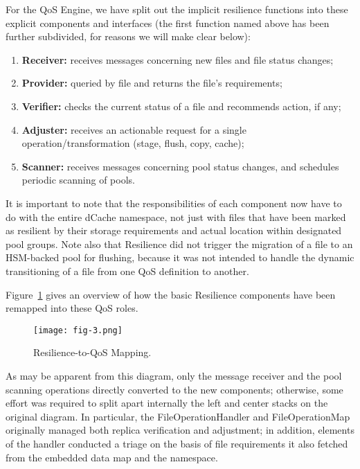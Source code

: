 \documentclass{webofc}
\begin{document}
For the QoS Engine, we have split out the implicit resilience functions into these explicit components and interfaces (the first function named above has been further subdivided, for reasons we will make clear below):


\begin{enumerate}

\item  {\bf Receiver:}  receives messages concerning new files and file status changes;
\item  {\bf Provider:}  queried by file and returns the file’s requirements;
\item  {\bf Verifier:}  checks the current status of a file and recommends action, if any;
\item  {\bf Adjuster:}  receives an actionable request for a single operation/transformation (stage, flush, copy, cache);
\item  {\bf Scanner:}  receives messages concerning pool status changes, and schedules periodic scanning of pools.

\end{enumerate}



It is important to note that the responsibilities of each component now have to do with the entire dCache namespace, not just with files that have been marked as resilient by their storage requirements and actual location within designated pool groups.  Note also that Resilience did not trigger the migration of a file to an HSM-backed pool for flushing, because it was not intended to handle the dynamic transitioning of a file from one QoS definition to another.

Figure~\ref{fig-3} gives an overview of how the basic Resilience components have been remapped into these QoS roles.

\begin{figure}[h]
\centering
\texttt{[image: fig-3.png]}
\caption{Resilience-to-QoS Mapping.}
\label{fig-3} 
\end{figure}

As may be apparent from this diagram, only the message receiver and the pool scanning operations directly converted to the new components; otherwise, some effort was required to split apart internally the left and center stacks on the original diagram.  In particular, the FileOperationHandler and FileOperationMap originally managed both replica verification and adjustment; in addition, elements of the handler conducted a triage on the basis of file requirements it also fetched from the embedded data map and the namespace.  
\end{document}
